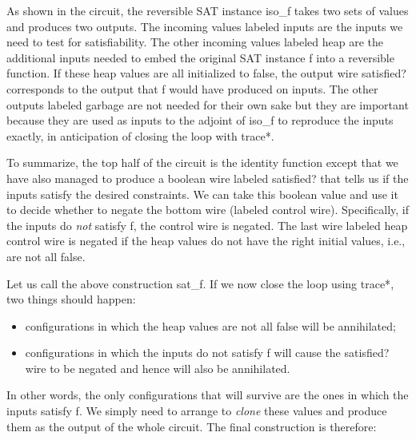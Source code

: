 \documentclass{llncs}
\begin{document}
\begin{center}
\end{center}  

As shown in the circuit, the reversible SAT instance {{iso_f}} takes
two sets of values and produces two outputs. The incoming values
labeled \textsf{inputs} are the inputs we need to test for
satisfiability. The other incoming values labeled \textsf{heap} are
the additional inputs needed to embed the original SAT instance {{f}}
into a reversible function. If these \textsf{heap} values are all
initialized to {{false}}, the output wire \textsf{satisfied?}
corresponds to the output that {{f}} would have produced on
\textsf{inputs}. The other outputs labeled \textsf{garbage} are not
needed for their own sake but they are important because they are used
as inputs to the adjoint of {{iso_f}} to reproduce the inputs exactly,
in anticipation of closing the loop with {{trace*}}.

To summarize, the top half of the circuit is the identity function
except that we have also managed to produce a boolean wire labeled
\textsf{satisfied?} that tells us if the inputs satisfy the desired
constraints. We can take this boolean value and use it to decide
whether to negate the bottom wire (labeled \textsf{control
  wire}). Specifically, if the inputs do \emph{not} satisfy {{f}}, the
control wire is negated. The last wire labeled \textsf{heap control
  wire} is negated if the heap values do not have the right initial
values, i.e., are not all {{false}}.

Let us call the above construction {{sat_f}}. If we now close the loop
using {{trace*}}, two things should happen:
\begin{itemize}
\item configurations in which the \textsf{heap} values are not all
  {{false}} will be annihilated;
\item configurations in which the \textsf{inputs} do not satisfy {{f}}
  will cause the \textsf{satisfied?} wire to be negated and hence will
  also be annihilated.
\end{itemize}
In other words, the only configurations that will survive are the ones in
which the \textsf{inputs} satisfy {{f}}. We simply need to arrange to
\emph{clone} these values and produce them as the output of the whole
circuit. The final construction is therefore:
\end{document}
